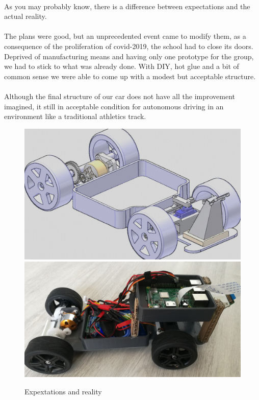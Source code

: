 \paragraph{}
As you may probably know, there is a difference between expectations and the
actual reality.

\paragraph{}
The plans were good, but an unprecedented event came to modify them, as a
consequence of the proliferation of covid-2019, the school had to close its
doors. Deprived of manufacturing means and having only one prototype for the
group, we had to stick to what was already done. With DIY, hot glue and a
bit of common sense we were able to come up with a modest but acceptable
structure.

\paragraph{}
Although the final structure of our car does not have all the improvement
imagined, it still in acceptable condition for autonomous driving in an
environment like a traditional athletics track.

\begin{figure}[!ht]
    \begin{center}
        \includegraphics[scale=0.4]{Images/plan_global.png}
        \includegraphics[scale=0.135]{Images/Kart_overview_1.jpg}
    \end{center}
    \caption{Expextations and reality}
    \label{fig:expectation_reality}
\end{figure}

